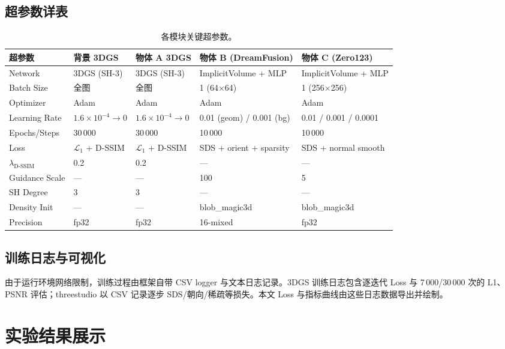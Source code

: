 \documentclass{article}
\begin{document}
\subsection{超参数详表}

\begin{table}[H]
  \centering
  \caption{各模块关键超参数。}
  \label{tab:hyper}
  \small
  \begin{tabular}{lllll}
    \toprule
    超参数 & 背景 3DGS & 物体 A 3DGS & 物体 B (DreamFusion) & 物体 C (Zero123) \\
    \midrule
    Network & 3DGS (SH-3) & 3DGS (SH-3) & ImplicitVolume + MLP & ImplicitVolume + MLP \\
    Batch Size & 全图 & 全图 & 1 (64$\times$64) & 1 (256$\times$256) \\
    Optimizer & Adam & Adam & Adam & Adam \\
    Learning Rate & $1.6\times10^{-4}\to0$ & $1.6\times10^{-4}\to0$ & 0.01 (geom) / 0.001 (bg) & 0.01 / 0.001 / 0.0001 \\
    Epochs/Steps & 30\,000 & 30\,000 & 10\,000 & 10\,000 \\
    Loss & $\mathcal{L}_1$ + D-SSIM & $\mathcal{L}_1$ + D-SSIM & SDS + orient + sparsity & SDS + normal smooth \\
    $\lambda_{\text{D-SSIM}}$ & 0.2 & 0.2 & --- & --- \\
    Guidance Scale & --- & --- & 100 & 5 \\
    SH Degree & 3 & 3 & --- & --- \\
    Density Init & --- & --- & blob\_magic3d & blob\_magic3d \\
    Precision & fp32 & fp32 & 16-mixed & fp32 \\
    \bottomrule
  \end{tabular}
\end{table}

\subsection{训练日志与可视化}
由于运行环境网络限制，训练过程由框架自带 CSV logger 与文本日志记录。3DGS 训练日志包含逐迭代 Loss 与 7\,000/30\,000 次的 L1、PSNR 评估；threestudio 以 CSV 记录逐步 SDS/朝向/稀疏等损失。本文 Loss 与指标曲线由这些日志数据导出并绘制。

\section{实验结果展示}
\end{document}
